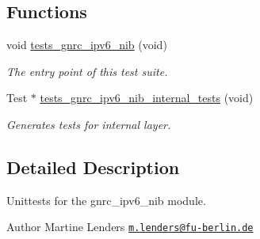 \subsection*{Functions}
\begin{DoxyCompactItemize}
\item 
void \hyperlink{group__unittests_ga94ab40380fa6a4f0472a693ef6b5a9c3}{tests\+\_\+gnrc\+\_\+ipv6\+\_\+nib} (void)
\begin{DoxyCompactList}\small\item\em The entry point of this test suite. \end{DoxyCompactList}\item 
Test $\ast$ \hyperlink{group__unittests_gabe2d41bf28233304c4a66a8ac44c9404}{tests\+\_\+gnrc\+\_\+ipv6\+\_\+nib\+\_\+internal\+\_\+tests} (void)
\begin{DoxyCompactList}\small\item\em Generates tests for internal layer. \end{DoxyCompactList}\end{DoxyCompactItemize}


\subsection{Detailed Description}
Unittests for the {\ttfamily gnrc\+\_\+ipv6\+\_\+nib} module. 

\begin{DoxyAuthor}{Author}
Martine Lenders \href{mailto:m.lenders@fu-berlin.de}{\tt m.\+lenders@fu-\/berlin.\+de} 
\end{DoxyAuthor}
